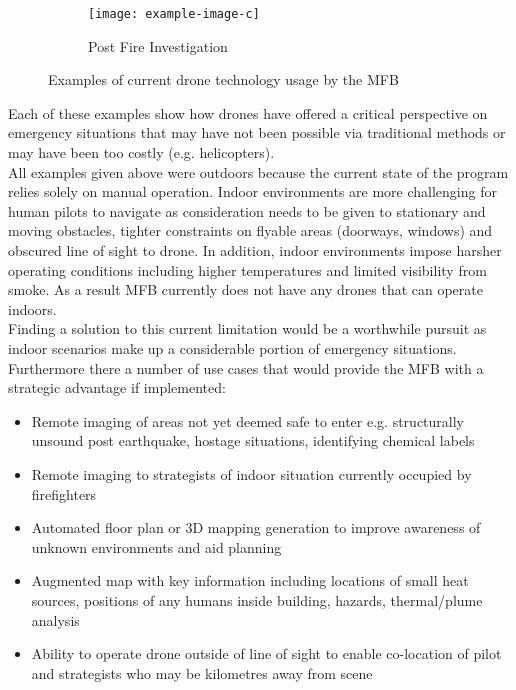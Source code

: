 \documentclass[capstone_report.tex]{subfiles}
\begin{document}
\begin{figure}
        \begin{subfigure}[b]{0.33\textwidth}
            \texttt{[image: example-image-c]}
            \caption{Post Fire Investigation}
            \label{fig:post_fire}
        \end{subfigure}
        \caption{Examples of current drone technology usage by the MFB}\label{fig:curren_usage}
    \end{figure}

    Each of these examples show how drones have offered a critical perspective on emergency situations that may have not been possible via traditional methods or may have been too costly (e.g. helicopters).\\

    All examples given above were outdoors because the current state of the program relies solely on manual operation.  Indoor environments are more challenging for human pilots to navigate as consideration needs to be given to stationary and moving obstacles, tighter constraints on flyable areas (doorways, windows) and obscured line of sight to drone.  In addition, indoor environments impose harsher operating conditions including higher temperatures and limited visibility from smoke.  As a result MFB currently does not have any drones that can operate indoors.\\

    Finding a solution to this current limitation would be a worthwhile pursuit as indoor scenarios make up a considerable portion of emergency situations.  Furthermore there a number of use cases that would provide the MFB with a strategic advantage if implemented:

    \begin{itemize}
        \item Remote imaging of areas not yet deemed safe to enter e.g. structurally unsound post earthquake, hostage situations, identifying chemical labels
        \item Remote imaging to strategists of indoor situation currently occupied by firefighters 
        \item Automated floor plan or 3D mapping generation to improve awareness of unknown environments and aid planning
        \item Augmented map with key information including locations of small heat sources,  positions of any humans inside building,  hazards, thermal/plume analysis
        \item Ability to operate drone outside of line of sight to enable co-location of pilot and strategists who may be kilometres away from scene
    \end{itemize}
\end{document}
